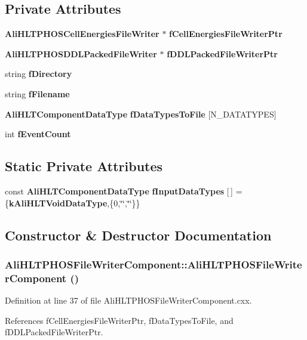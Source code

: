 \subsection*{Private Attributes}
\begin{CompactItemize}
\item 
{\bf Ali\-HLTPHOSCell\-Energies\-File\-Writer} $\ast$ {\bf f\-Cell\-Energies\-File\-Writer\-Ptr}
\item 
{\bf Ali\-HLTPHOSDDLPacked\-File\-Writer} $\ast$ {\bf f\-DDLPacked\-File\-Writer\-Ptr}
\item 
string {\bf f\-Directory}
\item 
string {\bf f\-Filename}
\item 
{\bf Ali\-HLTComponent\-Data\-Type} {\bf f\-Data\-Types\-To\-File} [N\_\-DATATYPES]
\item 
int {\bf f\-Event\-Count}
\end{CompactItemize}
\subsection*{Static Private Attributes}
\begin{CompactItemize}
\item 
const {\bf Ali\-HLTComponent\-Data\-Type} {\bf f\-Input\-Data\-Types} [$\,$] = \{{\bf k\-Ali\-HLTVoid\-Data\-Type},\{0,\char`\"{}\char`\"{},\char`\"{}\char`\"{}\}\}
\end{CompactItemize}


\subsection{Constructor \& Destructor Documentation}
\subsubsection{\setlength{\rightskip}{0pt plus 5cm}Ali\-HLTPHOSFile\-Writer\-Component::Ali\-HLTPHOSFile\-Writer\-Component ()}\label{classAliHLTPHOSFileWriterComponent_a0}




Definition at line 37 of file Ali\-HLTPHOSFile\-Writer\-Component.cxx.

References f\-Cell\-Energies\-File\-Writer\-Ptr, f\-Data\-Types\-To\-File, and f\-DDLPacked\-File\-Writer\-Ptr.

